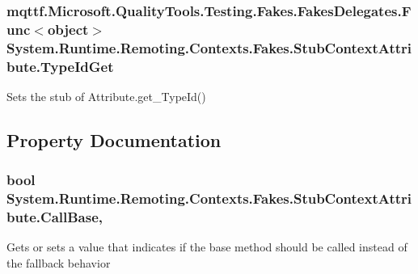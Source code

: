 \hypertarget{class_system_1_1_runtime_1_1_remoting_1_1_contexts_1_1_fakes_1_1_stub_context_attribute_ac3438ccdccb9b90a328e93f9c44640c0}{
\subsubsection[{Type\-Id\-Get}]{\setlength{\rightskip}{0pt plus 5cm}mqttf.\-Microsoft.\-Quality\-Tools.\-Testing.\-Fakes.\-Fakes\-Delegates.\-Func$<$object$>$ System.\-Runtime.\-Remoting.\-Contexts.\-Fakes.\-Stub\-Context\-Attribute.\-Type\-Id\-Get}}\label{class_system_1_1_runtime_1_1_remoting_1_1_contexts_1_1_fakes_1_1_stub_context_attribute_ac3438ccdccb9b90a328e93f9c44640c0}


Sets the stub of Attribute.\-get\-\_\-\-Type\-Id()



\subsection{Property Documentation}
\hypertarget{class_system_1_1_runtime_1_1_remoting_1_1_contexts_1_1_fakes_1_1_stub_context_attribute_acaddfe639c4d363fdb965bea88e078b9}{
\subsubsection[{Call\-Base}]{\setlength{\rightskip}{0pt plus 5cm}bool System.\-Runtime.\-Remoting.\-Contexts.\-Fakes.\-Stub\-Context\-Attribute.\-Call\-Base\hspace{0.3cm}{\ttfamily [get]}, {\ttfamily [set]}}}\label{class_system_1_1_runtime_1_1_remoting_1_1_contexts_1_1_fakes_1_1_stub_context_attribute_acaddfe639c4d363fdb965bea88e078b9}


Gets or sets a value that indicates if the base method should be called instead of the fallback behavior

